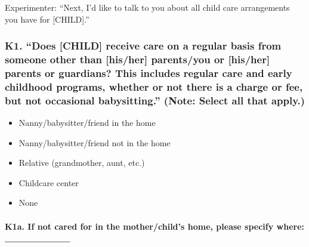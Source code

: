\documentclass[
  12pt,
]{book}
\providecommand{\tightlist}{%
  \setlength{\itemsep}{0pt}\setlength{\parskip}{0pt}}
\begin{document}
Experimenter: ``Next, I'd like to talk to you about all child care arrangements you have for {[}CHILD{]}.''

\hypertarget{k1.-does-child-receive-care-on-a-regular-basis-from-someone-other-than-hisher-parentsyou-or-hisher-parents-or-guardians-this-includes-regular-care-and-early-childhood-programs-whether-or-not-there-is-a-charge-or-fee-but-not-occasional-babysitting.-note-select-all-that-apply.}{%
\subsubsection*{K1. ``Does {[}CHILD{]} receive care on a regular basis from someone other than {[}his/her{]} parents/you or {[}his/her{]} parents or guardians? This includes regular care and early childhood programs, whether or not there is a charge or fee, but not occasional babysitting.'' (Note: Select all that apply.)}\label{k1.-does-child-receive-care-on-a-regular-basis-from-someone-other-than-hisher-parentsyou-or-hisher-parents-or-guardians-this-includes-regular-care-and-early-childhood-programs-whether-or-not-there-is-a-charge-or-fee-but-not-occasional-babysitting.-note-select-all-that-apply.}}

\begin{itemize}
\tightlist
\item
  Nanny/babysitter/friend in the home
\item
  Nanny/babysitter/friend not in the home
\item
  Relative (grandmother, aunt, etc.)
\item
  Childcare center
\item
  None
\end{itemize}

\hypertarget{k1a.-if-not-cared-for-in-the-motherchilds-home-please-specify-where-_________}{%
\paragraph*{K1a. If not cared for in the mother/child's home, please specify where: \_\_\_\_\_\_\_\_\_}\label{k1a.-if-not-cared-for-in-the-motherchilds-home-please-specify-where-_________}}
\end{document}
